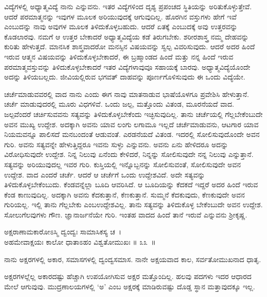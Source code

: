 ವಿದ್ಯೆಗಳಲ್ಲಿ ಅಧ್ಯಾತ್ಮವಿದ್ಯೆ ನಾನು ಎನ್ನುವನು. ಇತರ ವಿದ್ಯೆಗಳಿಂದ ದೃಶ್ಯ ಪ್ರಪಂಚದ ಸ್ಥಿತಿಯನ್ನು ಅರಿತುಕೊಳ್ಳುತ್ತೇವೆ. ಆದರೆ ಪರಮಾತ್ಮನನ್ನು ಇವುಗಳ ಮೂಲಕ ಅರಿಯುವುದಕ್ಕೆ ಆಗುವುದಿಲ್ಲ. ಹೊರಗಿನ ವಸ್ತುಗಳು ಹೇಗೆ ಇವೆ ಎಂಬುದನ್ನು ನಾವು ಅವುಗಳ ಮೂಲಕ ತಿಳಿದುಕೊಳ್ಳಬಹುದು. ಆದರೆ ಏತಕ್ಕೆ ಎಂಬುದಕ್ಕೆ ಅವು ಉತ್ತರವನ್ನು ಕೊಡಲಾರವು. ನಮಗೆ ಆ ಉತ್ತರ ಬೇಕಾದರೆ ಅಧ್ಯಾತ್ಮವಿದ್ಯೆಯ ಕಡೆ ತಿರುಗಬೇಕು. ಶರೀರಶಾಸ್ತ್ರ ನಮ್ಮ ದೇಹವನ್ನು ಕುರಿತು ಹೇಳುತ್ತದೆ. ಮಾನಸಿಕ ಶಾಸ್ತ್ರವಾದರೋ ಮನಸ್ಸಿನ ವಿಷಯವನ್ನು ಸ್ವಲ್ಪ ವಿವರಿಸುವುದು. ಆದರೆ ಅದರ ಹಿಂದೆ ಇರುವ ಆತ್ಮನ ವಿಷಯವನ್ನು ತಿಳಿದುಕೊಳ್ಳಬೇಕಾದರೆ, ಈ ಬ್ರಹ್ಮಾಂಡದ ಹಿಂದೆ ಮತ್ತು ನನ್ನ ಹಿಂದೆ ಇರುವ ಪರಮಾತ್ಮವಸ್ತುವನ್ನು ತಿಳಿದುಕೊಳ್ಳಬೇಕಾದರೆ ಇತರ ವಿದ್ಯೆಗಳಾವುವೂ ಸಹಾಯಕ್ಕೆ ಬಾರವು. ಅಧ್ಯಾತ್ಮವಿದ್ಯೆಯೊಂದೇ ಅದನ್ನು ತಿಳಿಯಬಲ್ಲದು. ಜೀವಿಯಲ್ಲಿರುವ ಭಗವತ್ ದಾಹವನ್ನು ಪೂರ್ಣಗೊಳಿಸುವುದು ಈ ಒಂದು ವಿದ್ಯೆಯೇ.

ಚರ್ಚೆಮಾಡುವವರಲ್ಲಿ ವಾದ ನಾನು ಎಂದು ಈಗ ನಾವು ಮಾತನಾಡುವ ಭಾಷೆಯೊಳಗೂ ಪ್ರವೇಶಿಸಿ ಹೇಳುತ್ತಾನೆ. ಚರ್ಚೆ ಮಾಡುವುದರಲ್ಲಿ ಮೂರು ವಿಧಗಳಿವೆ. ಒಂದು ಜಲ್ಪ, ಮತ್ತೊಂದು ವಿತಂಡ, ಮೂರನೆಯದೆ ವಾದ. ಜಲ್ಪವೆಂದರೆ ಚರ್ಚಿಸುವವನು ಸತ್ಯವನ್ನು ತಿಳಿದುಕೊಳ್ಳಬೇಕೆಂದು ಇಚ್ಛಿಸುವುದಿಲ್ಲ. ತಾನು ಚರ್ಚೆಯಲ್ಲಿ ಗೆಲ್ಲಬೇಕೆಂಬುದೇ ಅವನ ಮುಖ್ಯ ಉದ್ದೇಶ. ಅದಕ್ಕಾಗಿ ಅವನು ಯಾವ ಲಂಗು ಲಗಾಮೂ ಇಲ್ಲದೆ ಚರ್ಚೆಮಾಡುವನು, ಆಟಗಾರ ಯಾವ ನಿಯಮವನ್ನೂ ಪಾಲಿಸದೆ ಮನಬಂದಂತೆ ಆಡುವಂತೆ. ಎರಡನೆಯದೆ ವಿತಂಡ. ಇದರಲ್ಲಿ ಸೋಲಿಸುವುದೊಂದೇ ಅವನ ಗುರಿ. ಅವನು ಸತ್ಯವನ್ನೇ ಹೇಳುತ್ತಿದ್ದರೂ ಇವನು ಸುಳ್ಳು ಎನ್ನುವನು. ಅವನು ಏನು ಹೇಳಿದರೂ ಅದನ್ನು ವಿರೋಧಿಸುವುದೇ ಉದ್ದೇಶ. ನಿನ್ನ ನಿಲುವು ಏನೆಂದು ಕೇಳಿದರೆ, ನಿನ್ನನ್ನು ಸೋಲಿಸುವುದೇ ನನ್ನ ನಿಲುವು ಎನ್ನುತ್ತಾನೆ. ಸತ್ಯವನ್ನು ಅರಿಯುವುದಲ್ಲ ಇವರ ಗುರಿ. ಕುಸ್ತಿಯಲ್ಲಿ ಇನ್ನೊಬ್ಬನನ್ನು ಸೋಲಿಸುವಂತೆ, ಸೋಲಿಸುವುದೇ ಅವನ ಉದ್ದೇಶ. ವಾದ ಎಂದರೆ ಚರ್ಚೆ. ಆದರೆ ಆ ಚರ್ಚೆಗೆ ಒಂದು ಉದ್ದೇಶವಿದೆ. ಅದೇ ಸತ್ಯವನ್ನು ತಿಳಿದುಕೊಳ್ಳಬೇಕೆಂಬುದು. ಕೆಂಡವನ್ನೆಲ್ಲಾ ಬೂದಿ ಆವರಿಸಿದೆ. ಆ ಬೂದಿಯನ್ನು ಕೆದಕದೆ ಇದ್ದರೆ ಅದರ ಹಿಂದೆ ಇರುವ ಕೆಂಡ ಕಾಣುವುದಿಲ್ಲ. ಅದಕ್ಕಾಗಿ ಅವನು ಕೆದಕುತ್ತಾನೆ, ಕೆಣಕುತ್ತಾನೆ. ಸುಮ್ಮನೆ ಕೆದಕುವುದು, ಕೆಣಕುವುದೇ ಅವನ ಗುರಿಯಲ್ಲ. ಇಲ್ಲಿ ತಾನು ಗೆಲ್ಲಬೇಕು ಎಂಬ\break ಉದ್ದೇಶವಿಲ್ಲ. ತಾನು ಸತ್ಯವನ್ನು ತಿಳಿದುಕೊಳ್ಳ ಬೇಕೆಂಬುದೇ ಅವನ ಉದ್ದೇಶ. ಸೋಲುಗೆಲವುಗಳು ಗೌಣ. ಜ್ಞಾನಾರ್ಜನೆಯೇ ಗುರಿ. ಇಂತಹ ವಾದದ ಹಿಂದೆ ತಾನೆ ಇರುವೆ ಎನ್ನುವನು ಶ‍್ರೀಕೃಷ್ಣ.

\begin{shloka}
ಅಕ್ಷರಾಣಾಮಕಾರೋಽಸ್ಮಿ ದ್ವಂದ್ವಃ ಸಾಮಾಸಿಕಸ್ಯ ಚ~।\\ಅಹಮೇವಾಕ್ಷಯಃ ಕಾಲೋ ಧಾತಾಽಹಂ ವಿಶ್ವತೋಮುಖಃ \hfill॥ ೩೩~॥ 
\end{shloka}

\begin{artha}
ನಾನು ಅಕ್ಷರಗಳಲ್ಲಿ ಅಕಾರ, ಸಮಾಸಗಳಲ್ಲಿ ದ್ವಂದ್ವಸಮಾಸ. ನಾನೇ ಅಕ್ಷಯವಾದ ಕಾಲ, ಸರ್ವತೋಮುಖನಾದ ಧಾತೃ.
\end{artha}

ಅಕ್ಷರಗಳಲ್ಲೆಲ್ಲ ಅಕಾರದಷ್ಟು ಹೆಚ್ಚಾಗಿ ಉಪಯೋಗಿಸುವ ಅಕ್ಷರ ಮತ್ತೊಂದಿಲ್ಲ. ಹಲವು ಪದಗಳು ಇದರ ಆಧಾರದ ಮೇಲೆ ಆಗುವುವು. ಮುದ್ರಣಾಲಯಗಳಲ್ಲಿ ‘ಅ’ ಎಂಬ ಅಕ್ಷರಕ್ಕೆ ಮಾಡಿರುವಷ್ಟು ದೊಡ್ಡ ಸ್ಥಾನ ಮತ್ತಾವುದಕ್ಕೂ ಇಲ್ಲ.

